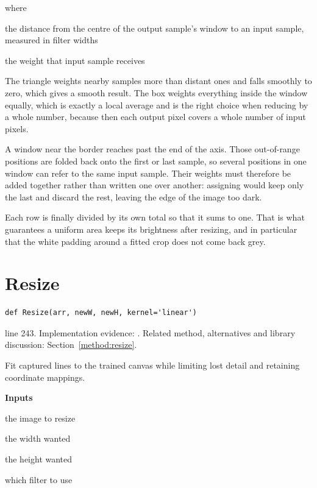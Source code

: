 \noindent where
\begin{description}[leftmargin=2.4em,style=nextline,font=\normalfont\ttfamily]\setlength\itemsep{1pt}
  \item[{$t$}] \normalfont the distance from the centre of the output sample's window to an input sample, measured in filter widths
  \item[{$w(t)$}] \normalfont the weight that input sample receives
\end{description}
The triangle weights nearby samples more than distant ones and falls smoothly to zero, which gives a smooth result. The box weights everything inside the window equally, which is exactly a local average and is the right choice when reducing by a whole number, because then each output pixel covers a whole number of input pixels.


A window near the border reaches past the end of the axis. Those out-of-range positions are folded back onto the first or last sample, so several positions in one window can refer to the same input sample. Their weights must therefore be added together rather than written one over another: assigning would keep only the last and discard the rest, leaving the edge of the image too dark.

Each row is finally divided by its own total so that it sums to one. That is what guarantees a uniform area keeps its brightness after resizing, and in particular that the white padding around a fitted crop does not come back grey.



\section{Resize}\label{fn:segment:Resize}
\begin{lstlisting}[style=sig]
def Resize(arr, newW, newH, kernel='linear')
\end{lstlisting}
 line 243. Implementation evidence: \cite{code2026}. Related method, alternatives and library discussion: Section~\ref{method:resize}.


Fit captured lines to the trained canvas while limiting lost detail and retaining coordinate mappings.




\noindent\textbf{Inputs}
\begin{description}[leftmargin=2.2em,style=nextline,font=\normalfont\ttfamily]\setlength\itemsep{1pt}
  \item[{img}] \normalfont the image to resize
  \item[{newW}] \normalfont the width wanted
  \item[{newH}] \normalfont the height wanted
  \item[{kernel}] \normalfont which filter to use
\end{description}

